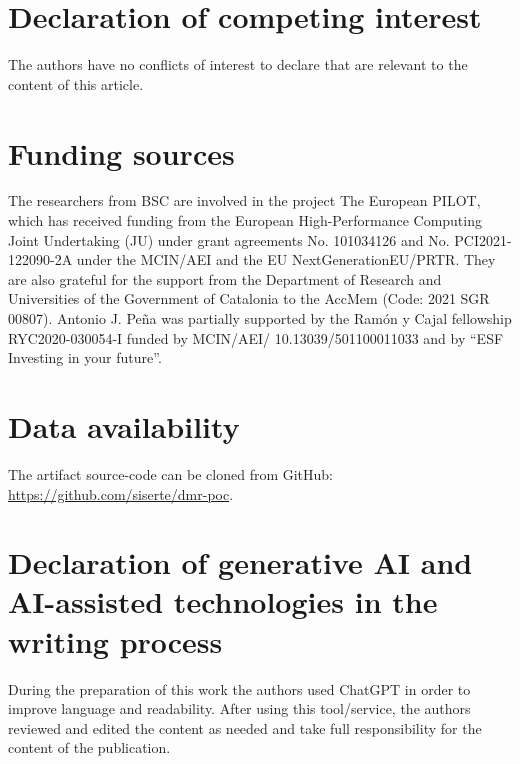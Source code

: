 \documentclass[a4paper,fleqn]{cas-dc}
\begin{document}
\section*{Declaration of competing interest}
The authors have no conflicts of interest to declare that are relevant to the content of this article.

\section*{Funding sources}
The researchers from BSC are involved in the project The European PILOT, which has received funding from the European High-Performance Computing Joint Undertaking (JU) under grant agreements No. 101034126 and No. PCI2021-122090-2A under the MCIN/AEI and the EU NextGenerationEU/PRTR.
They are also grateful for the support from the Department of Research and Universities of the Government of Catalonia to the AccMem (Code: 2021 SGR 00807).
Antonio J. Peña was partially supported by the Ramón y Cajal fellowship RYC2020-030054-I funded by MCIN/AEI/ 10.13039/501100011033 and by ``ESF Investing in your future''.

\section*{Data availability}
The artifact source-code can be cloned from GitHub: \url{https://github.com/siserte/dmr-poc}.

\section*{Declaration of generative AI and AI-assisted technologies in the writing process}
During the preparation of this work the authors used ChatGPT in order to improve language and readability. After using this tool/service, the authors reviewed and edited the content as needed and take full responsibility for the content of the publication.



\end{document}
